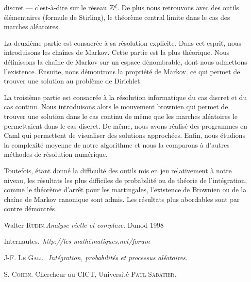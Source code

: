 \documentclass[a4paper, 10pt]{article}
\begin{document}
discret --- c'est-à-dire sur le réseau ${\mathbb{Z}}^d$. De plus nous retrouvons avec des outils 
élémentaires (formule de Stirling), le théorème central limite dans le cas des marches aléatoires.
\par
La deuxième partie est consacrée à sa résolution explicite. Dans cet esprit, nous introduisons les chaînes de Markov. 
Cette partie est la plus théorique. Nous définissons la chaîne de Markov sur un espace dénombrable, dont
nous admettons l'existence. Ensuite, nous démontrons la propriété de Markov, ce qui permet
de trouver une solution au problème de Dirichlet.\par
La troisième partie est consacrée à la résolution informatique du cas discret et du cas continu. 
Nous introduisons alors le mouvement brownien qui permet de trouver une 
solution dans le cas continu de même que les marches aléatoires le permettaient dans le cas 
discret. De même, nous avons réalisé des programmes en Caml qui permettent de visualiser des 
solutions approchées. Enfin, nous étudions la complexité moyenne de notre algorithme et nous la 
comparons à d'autres méthodes de résolution numérique.\par
Toutefois, étant donné la difficulté des outils mis en jeu relativement à notre niveau,
les résultats les plus difficiles de probabilité ou de théorie de l'intégration, comme
le théorème d'arrêt pour les martingales, l'existence de Brownien ou de la chaîne de 
Markov canonique sont admis. Les résultats plus abordables sont par contre démontrés.

 


%

\begin{thebibliography}{a}
Walter \textsc{Rudin}.\emph{Analyse réelle et complexe}.
Dunod 1998

Internautes.\ \emph{http://les-mathématiques.net/forum}

J-F. \textsc{Le Gall}.\ \emph{Intégration, probabilités et processus aléatoires}.

S. \textsc{Cohen}.
Chercheur au CICT, Université \textsc{Paul Sabatier}.


\end{thebibliography}
\end{document}
